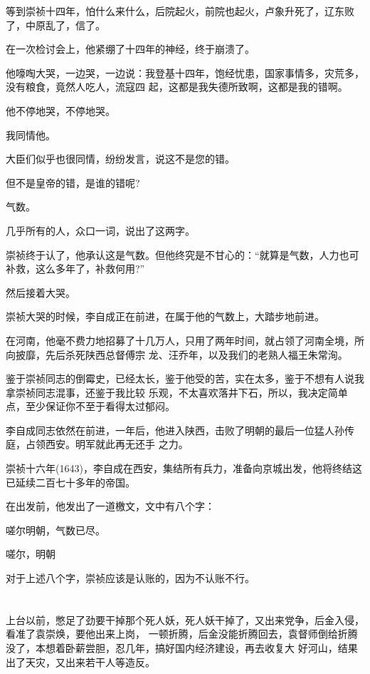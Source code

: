 \documentclass[11pt,a4paper,onecolumn]{article}
\begin{document}
等到崇祯十四年，怕什么来什么，后院起火，前院也起火，卢象升死了，辽东败了，中原乱了，信了。

在一次检讨会上，他紧绷了十四年的神经，终于崩溃了。

他嚎啕大哭，一边哭，一边说：我登基十四年，饱经忧患，国家事情多，灾荒多，没有粮食，竟然人吃人，流寇四
起，这都是我失德所致啊，这都是我的错啊。

他不停地哭，不停地哭。

我同情他。

大臣们似乎也很同情，纷纷发言，说这不是您的错。

但不是皇帝的错，是谁的错呢?

气数。

几乎所有的人，众口一词，说出了这两字。

崇祯终于认了，他承认这是气数。但他终究是不甘心的：``就算是气数，人力也可补救，这么多年了，补救何用?''

然后接着大哭。

崇祯大哭的时候，李自成正在前进，在属于他的气数上，大踏步地前进。

在河南，他毫不费力地招募了十几万人，只用了两年时间，就占领了河南全境，所向披靡，先后杀死陕西总督傅宗
龙、汪乔年，以及我们的老熟人福王朱常洵。

鉴于崇祯同志的倒霉史，已经太长，鉴于他受的苦，实在太多，鉴于不想有人说我拿崇祯同志混事，还鉴于我比较
乐观，不太喜欢落井下石，所以，我决定简单点，至少保证你不至于看得太过郁闷。

李自成同志依然在前进，一年后，他进入陕西，击败了明朝的最后一位猛人孙传庭，占领西安。明军就此再无还手
之力。

崇祯十六年(1643)，李自成在西安，集结所有兵力，准备向京城出发，他将终结这已延续二百七十多年的帝国。

在出发前，他发出了一道檄文，文中有八个字：

嗟尔明朝，气数已尽。

嗟尔，明朝

对于上述八个字，崇祯应该是认账的，因为不认账不行。

\section[\thesection]{}

上台以前，憋足了劲要干掉那个死人妖，死人妖干掉了，又出来党争，后金入侵，看准了袁崇焕，要他出来上岗，
一顿折腾，后金没能折腾回去，袁督师倒给折腾没了，本想着卧薪尝胆，忍几年，搞好国内经济建设，再去收复大
好河山，结果出了天灾，又出来若干人等造反。
\end{document}
